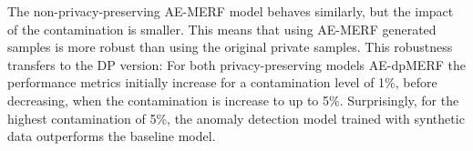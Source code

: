 The non-privacy-preserving AE-MERF model behaves similarly, but the impact of the contamination is smaller. This means that using AE-MERF generated samples is more robust than using the original private samples. This robustness transfers to the DP version: For both privacy-preserving models AE-dpMERF the performance metrics initially increase for a contamination level of 1\%, before decreasing, when the contamination is increase to up to 5\%. Surprisingly, for the highest contamination of 5\%, the anomaly detection model trained with synthetic data outperforms the baseline model. 

